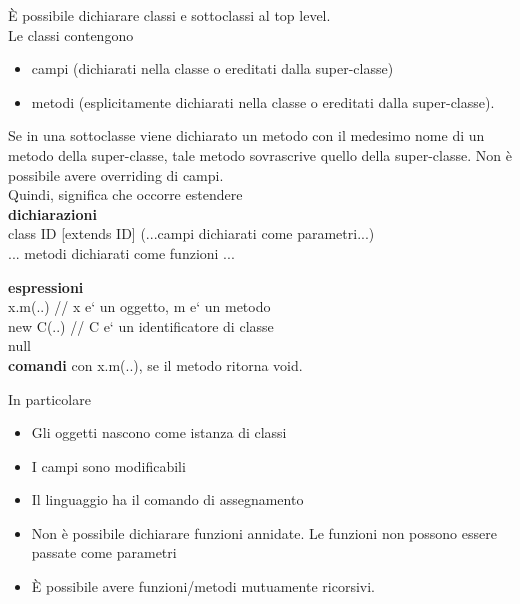 \documentclass[a4paper]{article}   %
\begin{document}
È possibile dichiarare classi e sottoclassi  al top level.\\
Le classi contengono
  \begin{itemize}
    \item campi (dichiarati nella classe o ereditati dalla super-classe)
    \item metodi (esplicitamente dichiarati nella classe o ereditati dalla super-classe).
  \end{itemize}
Se in una sottoclasse viene dichiarato un metodo con il medesimo nome
di un metodo della super-classe, tale metodo sovrascrive quello della
super-classe. Non è possibile avere overriding di campi.\\
Quindi, significa che occorre estendere\\


\textbf{dichiarazioni}\\

   class ID [extends ID] (...campi dichiarati come parametri...) {\\

     ... metodi dichiarati come funzioni ...\\

   }

\textbf{espressioni}\\

   x.m(..)          // x e` un oggetto, m e` un metodo\\

   new C(..)				// C e` un identificatore di classe\\

   null\\

\textbf{comandi} con x.m(..), se il metodo ritorna void.

In particolare

\begin{itemize}

  \item Gli oggetti nascono come istanza di classi
  \item I campi sono modificabili
  \item Il linguaggio ha il comando di assegnamento
  \item Non è possibile dichiarare funzioni annidate. Le funzioni non possono
    essere passate come parametri
  \item È possibile avere funzioni/metodi mutuamente ricorsivi.

\end{itemize}
\end{document}
